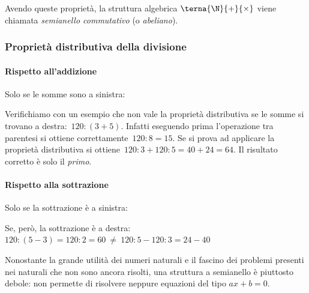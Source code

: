 Avendo queste proprietà, la struttura algebrica 
\(\terna{\N}{+}{\times}\)\indc{\(\N\)}{\(\terna{\N}{+}{\times}\)} 
viene chiamata \emph{semianello commutativo} (o \emph{abeliano}).


\subsubsection{Proprietà distributiva della divisione}

\paragraph{Rispetto all'addizione}
Solo se le somme sono a sinistra:


Verifichiamo con un esempio che non vale la proprietà distributiva se le 
somme si trovano a destra:~\(120 : (3 + 5)\).
Infatti eseguendo prima l'operazione tra parentesi si ottiene 
correttamente~\(120 : 8 = 15\). Se si prova ad applicare
la proprietà distributiva
si ottiene~\(120 : 3 + 120 : 5 = 40 + 24 = 64\). 
Il risultato corretto è solo il \emph{primo}.

\paragraph{Rispetto alla sottrazione}
Solo se la sottrazione è a sinistra:


Se, però, la sottrazione è a destra:\\
\(120 : (5 - 3) = 120 : 2 = 60 ~\neq~ 
  120 : 5 - 120 : 3 = 24 - 40\)

\begin{osservazione}{}{}
Nonostante la grande utilità dei numeri naturali e il fascino dei problemi 
presenti nei naturali che non sono ancora risolti, una struttura a 
semianello è piuttosto debole:
non permette di risolvere neppure equazioni del tipo \(ax + b = 0\).
\end{osservazione}


